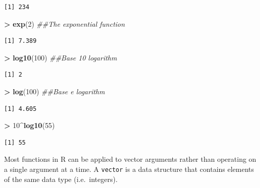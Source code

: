 \documentclass[]{krantz}
\makeatletter
\newenvironment{Shaded}{\begin{snugshade}}{\end{snugshade}}
\newcommand{\CommentTok}[1]{\textcolor[rgb]{0.37,0.37,0.37}{\textit{#1}}}
\newcommand{\DecValTok}[1]{\textcolor[rgb]{0.06,0.06,0.06}{#1}}
\newcommand{\KeywordTok}[1]{\textcolor[rgb]{0.27,0.27,0.27}{\textbf{#1}}}
\newcommand{\NormalTok}[1]{#1}
\newcommand{\OperatorTok}[1]{\textcolor[rgb]{0.43,0.43,0.43}{\textbf{#1}}}
\newcommand{\StringTok}[1]{\textcolor[rgb]{0.5,0.5,0.5}{#1}}
\newenvironment{kframe}{%
\medskip{}
\setlength{\fboxsep}{.8em}
 \def\at@end@of@kframe{}%
 \ifinner\ifhmode%
  \def\at@end@of@kframe{\end{minipage}}%
  \begin{minipage}{\columnwidth}%
 \fi\fi%
 \def\FrameCommand##1{\hskip\@totalleftmargin \hskip-\fboxsep
 \colorbox{shadecolor}{##1}\hskip-\fboxsep
     \hskip-\linewidth \hskip-\@totalleftmargin \hskip\columnwidth}%
 \MakeFramed {\advance\hsize-\width
   \@totalleftmargin\z@ \linewidth\hsize
   \@setminipage}}%
 {\par\unskip\endMakeFramed%
 \at@end@of@kframe}
\renewenvironment{Shaded}{\begin{kframe}}{\end{kframe}}
\makeatother
\begin{document}
\begin{verbatim}
[1] 234
\end{verbatim}

\begin{Shaded}
\begin{Highlighting}[]
\OperatorTok{>}\StringTok{ }\KeywordTok{exp}\NormalTok{(}\DecValTok{2}\NormalTok{)  }\CommentTok{##The exponential function}
\end{Highlighting}
\end{Shaded}

\begin{verbatim}
[1] 7.389
\end{verbatim}

\begin{Shaded}
\begin{Highlighting}[]
\OperatorTok{>}\StringTok{ }\KeywordTok{log10}\NormalTok{(}\DecValTok{100}\NormalTok{)  }\CommentTok{##Base 10 logarithm}
\end{Highlighting}
\end{Shaded}

\begin{verbatim}
[1] 2
\end{verbatim}

\begin{Shaded}
\begin{Highlighting}[]
\OperatorTok{>}\StringTok{ }\KeywordTok{log}\NormalTok{(}\DecValTok{100}\NormalTok{)  }\CommentTok{##Base e logarithm}
\end{Highlighting}
\end{Shaded}

\begin{verbatim}
[1] 4.605
\end{verbatim}

\begin{Shaded}
\begin{Highlighting}[]
\OperatorTok{>}\StringTok{ }\DecValTok{10}\OperatorTok{^}\KeywordTok{log10}\NormalTok{(}\DecValTok{55}\NormalTok{)}
\end{Highlighting}
\end{Shaded}

\begin{verbatim}
[1] 55
\end{verbatim}

Most functions in R can be applied to vector arguments rather than operating on a single argument at a time. A \texttt{vector} is a data structure that contains elements of the same data type (i.e.~integers).
\end{document}
